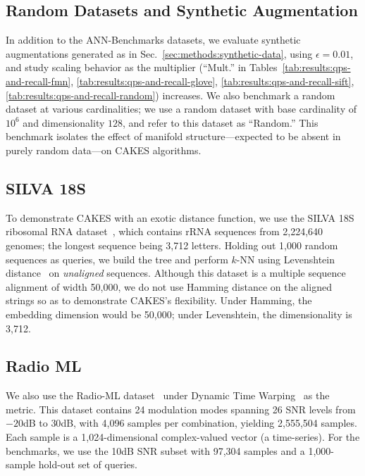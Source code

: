 \subsection{Random Datasets and Synthetic Augmentation}
\label{sec:datasets-and-benchmarks:random-datasets}

In addition to the ANN-Benchmarks datasets, we evaluate synthetic augmentations generated as in Sec.~\ref{sec:methods:synthetic-data}, using $\epsilon=0.01$, and study scaling behavior as the multiplier (“Mult.” in Tables~\ref{tab:results:qps-and-recall-fmn}, \ref{tab:results:qps-and-recall-glove}, \ref{tab:results:qps-and-recall-sift}, \ref{tab:results:qps-and-recall-random}) increases.
We also benchmark a random dataset at various cardinalities;
we use a random dataset with base cardinality of $10^6$ and dimensionality $128$, and refer to this dataset as ``Random.''
This benchmark isolates the effect of manifold structure—expected to be absent in purely random data—on CAKES algorithms.


\subsection{SILVA 18S}
\label{sec:datasets-and-benchmarks:silva-18s}

To demonstrate CAKES with an exotic distance function, we use the SILVA 18S ribosomal RNA dataset~\cite{10.1093/nar/gks1219}, which contains rRNA sequences from 2,224,640 genomes;
the longest sequence being 3,712 letters.
Holding out 1,000 random sequences as queries, we build the tree and perform $k$-NN using Levenshtein distance~\cite{levenshtein1966binary} on \emph{unaligned} sequences.
Although this dataset is a multiple sequence alignment of width 50,000, we do not use Hamming distance on the aligned strings so as to demonstrate CAKES's flexibility.
Under Hamming, the embedding dimension would be 50,000;
under Levenshtein, the dimensionality is 3,712.

\subsection{Radio ML}
\label{sec:datasets-and-benchmarks:radio-ml}

We also use the Radio-ML dataset~\cite{oshea2018radioml} under Dynamic Time Warping~\cite{muller2007dynamic} as the metric.
This dataset contains 24 modulation modes spanning 26 SNR levels from $-20$dB to $30$dB, with 4,096 samples per combination, yielding 2,555,504 samples.
Each sample is a 1,024-dimensional complex-valued vector (a time-series).
For the benchmarks, we use the 10dB SNR subset with 97,304 samples and a 1,000-sample hold-out set of queries.

